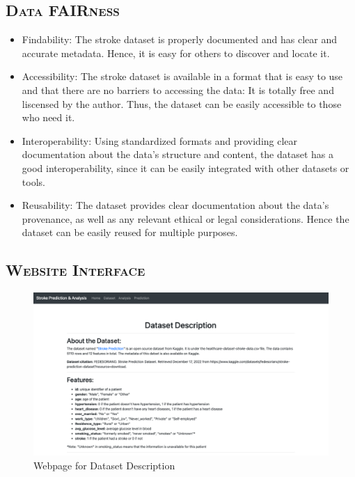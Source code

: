 \documentclass[a4paper,12pt]{article}
\begin{document}
\subsection{\textsc{Data FAIRness}}
\begin{itemize}
\item Findability: The stroke dataset is properly documented and has clear and accurate metadata. Hence, it is easy for others to discover and locate it.
\item Accessibility: The stroke dataset is available in a format that is easy to use and that there are no barriers to accessing the data: It is totally free and liscensed by the author. Thus, the dataset can be easily accessible to those who need it.
\item Interoperability: Using standardized formats and providing clear documentation about the data's structure and content, the dataset has a good interoperability, since it can be easily integrated with other datasets or tools.
\item Reusability: The dataset provides clear documentation about the data's provenance, as well as any relevant ethical or legal considerations. Hence the dataset can be easily reused for multiple purposes.
\end{itemize}
\subsection{\textsc{Website Interface}}
\begin{figure}[h] 
    \centering
    \includegraphics[width=1\textwidth]{home_p6} 
    \caption{Webpage for Dataset Description} 
\end{figure}
\newpage

\end{document}
